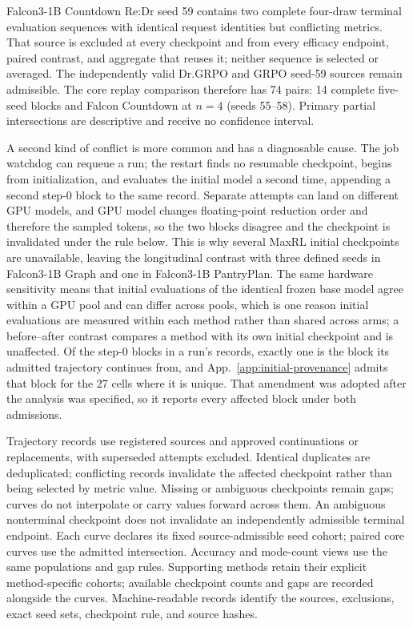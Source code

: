 \documentclass{article}
\newcommand{\1}{\mathbf 1}
\theoremstyle{remark}
\theoremstyle{definition}
\theoremstyle{plain}
\begin{document}
Falcon3-1B Countdown Re:Dr seed 59 contains two complete four-draw
terminal evaluation sequences with identical request identities but
conflicting metrics. That source is excluded at every
checkpoint and from every efficacy endpoint, paired contrast, and aggregate
that reuses it; neither sequence is selected or averaged. The independently
valid Dr.GRPO and GRPO seed-59 sources remain admissible. The core replay
comparison therefore has 74 pairs: 14 complete five-seed blocks and Falcon
Countdown at $n=4$ (seeds 55--58). Primary partial intersections are
descriptive and receive no confidence interval.

A second kind of conflict is more common and has a diagnosable cause. The job
watchdog can requeue a run; the restart finds no resumable checkpoint, begins
from initialization, and evaluates the initial model a second time, appending a
second step-0 block to the same record. Separate attempts can land on different
GPU models, and GPU model changes floating-point reduction order and therefore
the sampled tokens, so the two blocks disagree and the checkpoint is invalidated
under the rule below. This is why several MaxRL initial checkpoints are
unavailable, leaving the longitudinal contrast with three defined seeds in
Falcon3-1B Graph and one in Falcon3-1B PantryPlan. The same hardware
sensitivity means that initial evaluations of the identical frozen base model
agree within a GPU pool and can differ across pools, which is one reason
initial evaluations are measured within each method rather than shared across
arms; a before--after contrast compares a method with its own initial
checkpoint and is unaffected. Of the step-0 blocks in a run's records, exactly one is the block its admitted
trajectory continues from, and App.~\ref{app:initial-provenance} admits that
block for the 27 cells where it is unique. That amendment was adopted after the
analysis was specified, so it reports every affected block under both
admissions.

Trajectory records use registered sources and approved continuations or
replacements, with superseded attempts excluded. Identical duplicates are
deduplicated; conflicting records invalidate the affected checkpoint rather
than being selected by metric value. Missing or ambiguous checkpoints remain gaps;
curves do not interpolate or carry values forward across them. An ambiguous
nonterminal checkpoint does not invalidate an independently admissible
terminal endpoint. Each curve declares its fixed source-admissible seed cohort; paired core
curves use the admitted intersection. Accuracy and mode-count views use
the same populations and gap rules. Supporting methods retain their
explicit method-specific cohorts; available checkpoint counts and gaps
are recorded alongside the curves. Machine-readable records identify the
sources, exclusions, exact seed sets, checkpoint rule, and source hashes.
\end{document}
